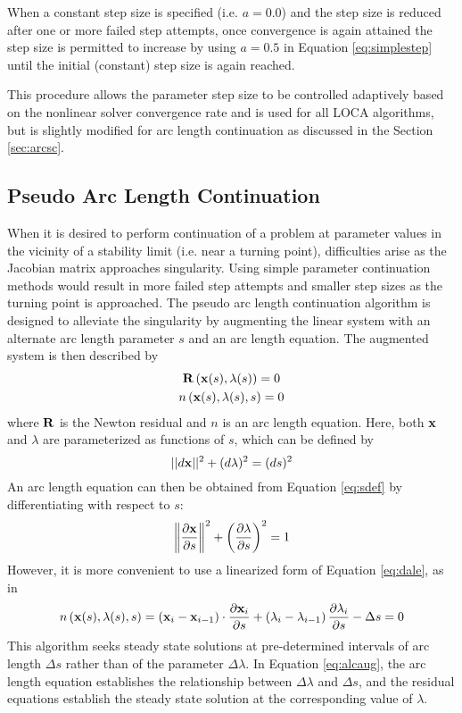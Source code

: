 When a constant step size is specified (i.e. $a=0.0$) and the step size is reduced after one or more failed step attempts, once convergence is again attained the step size is permitted to increase by using $a=0.5$ in Equation \ref{eq:simplestep} until the initial (constant) step size is again reached.

This procedure allows the parameter step size to be controlled adaptively based on the nonlinear solver convergence rate and is used for all LOCA algorithms, but is slightly modified for arc length continuation as discussed in the Section \ref{sec:arcsc}.

\subsection{Pseudo Arc Length Continuation}
\label{sec:arc}

When it is desired to perform continuation of a problem at parameter values in the vicinity of a stability limit (i.e. near a turning point), difficulties arise as the Jacobian matrix approaches singularity. Using simple parameter continuation methods would result in more failed step attempts and smaller step sizes as the turning point is approached. The pseudo arc length continuation algorithm \cite{keller77} is designed to alleviate the singularity by augmenting the linear system with an alternate arc length parameter $s$ and an arc length equation. The augmented system is then described by
\begin{gather}
\label{eq:alcaug}
{\bf R} \left( {\bf x}(s), \lambda(s) \right) = 0 \\
n \left( {\bf x}(s), \lambda(s), s \right) = 0
\end{gather}
where ${\bf R}$ is the Newton residual and $n$ is an arc length equation.
Here, both ${\bf x}$ and $\lambda$ are parameterized as functions of $s$, which can be defined by
\begin{equation}
\label{eq:sdef}
||d{\bf x}||^2 + (d\lambda)^2 = (ds)^2
\end{equation}
An arc length equation can then be obtained from Equation \ref{eq:sdef} by differentiating with respect to $s$:
\begin{equation}
\label{eq:dale}
\left\|\frac{\partial {\bf x}}{\partial s} \right\|^2 + \left( \frac{\partial \lambda}{\partial s} \right)^2 = 1
\end{equation}
However, it is more convenient to use a linearized form of Equation \ref{eq:dale}, as in \cite{jnsthesis}
\begin{equation}
\label{lale}
n \left( {\bf x}(s), \lambda(s), s \right) = \left( {\bf x}_i - {\bf x}_{i-1} \right) \cdot \frac{\partial {\bf x}_i}{\partial s} + \left( \lambda_i - \lambda_{i-1} \right) \frac{\partial \lambda_i}{\partial s} - \Delta s = 0
\end{equation}
This algorithm seeks steady state solutions at pre-determined intervals of arc length $\Delta s$ rather than of the parameter $\Delta \lambda$. In Equation \ref{eq:alcaug}, the arc length equation establishes the relationship between $\Delta \lambda$ and $\Delta s$, and the residual equations establish the steady state solution at the corresponding value of $\lambda$.

